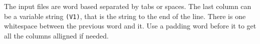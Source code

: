 The input files are word based separated by tabs or spaces. The last
column can be a variable string \texttt{(V1)}, that is the string to the
end of the line. There is one whitespace between the previous word and
it. Use a padding word before it to get all the columns alligned if
needed.
